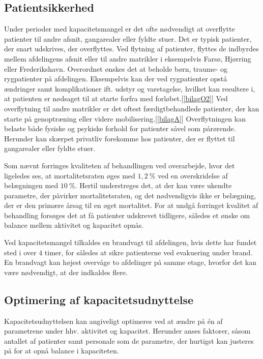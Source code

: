 \subsection{Patientsikkerhed}\label{patsik}
Under perioder med kapacitetsmangel er det ofte nødvendigt at overflytte patienter til andre afsnit, gangarealer eller fyldte stuer. Det er typisk patienter, der snart udskrives, der overflyttes. Ved flytning af patienter, flyttes de indbyrdes mellem afdelingens afsnit eller til andre matrikler i eksempelvis Farsø, Hjørring eller Frederikshavn. Overordnet ønskes det at beholde børn, traume- og rygpatienter på afdelingen. Eksempelvis kan der ved rygpatienter opstå ændringer samt komplikationer ift. udstyr og varetagelse, hvilket kan resultere i, at patienten er nødsaget til at starte forfra med forløbet.[\ref{bilagO2}] Ved overflytning til andre matrikler er det oftest færdigtbehandlede patienter, der kan starte på genoptræning eller videre mobilisering.[\ref{bilagA}] Overflytningen kan belaste både fysiske og psykiske forhold for patienter såvel som pårørende\cite{Heidmann2014}. Herunder kan skærpet privatliv forekomme hos patienter, der er flyttet til gangarealer eller fyldte stuer\cite{Madsen2014}. 

Som nævnt forringes kvaliteten af behandlingen ved overarbejde, hvor det ligeledes ses, at mortalitetsraten øges med $1,2~\%$ ved en overskridelse af belægningen med $10~\%$\cite{Madsen2014}. Hertil understreges det, at der kan være ukendte parametre, der påvirker mortalitetsraten, og det nødvendigvis ikke er belægning, der er den primære årsag til en øget mortalitet. For at undgå forringet kvalitet af behandling forsøges det at få patienter udskrevet tidligere, således et ønske om balance mellem aktivitet og kapacitet opnås.


Ved kapacitetsmangel tilkaldes en brandvagt til afdelingen, hvis dette har fundet sted i over $4$ timer, for således at sikre patienterne ved evakuering under brand. En brandvagt kan højest overvåge to afdelinger på samme etage, hvorfor det kan være nødvendigt, at der indkaldes flere.\cite{Beredskab2016}


\subsection{Optimering af kapacitetsudnyttelse}
Kapacitetsudnyttelsen kan angiveligt optimeres ved at ændre på én af parametrene under hhv. aktivitet og kapacitet. Herunder anses faktorer, såsom antallet af patienter samt personale som de parametre, der hurtigst kan justeres på for at opnå balance i kapaciteten. 

